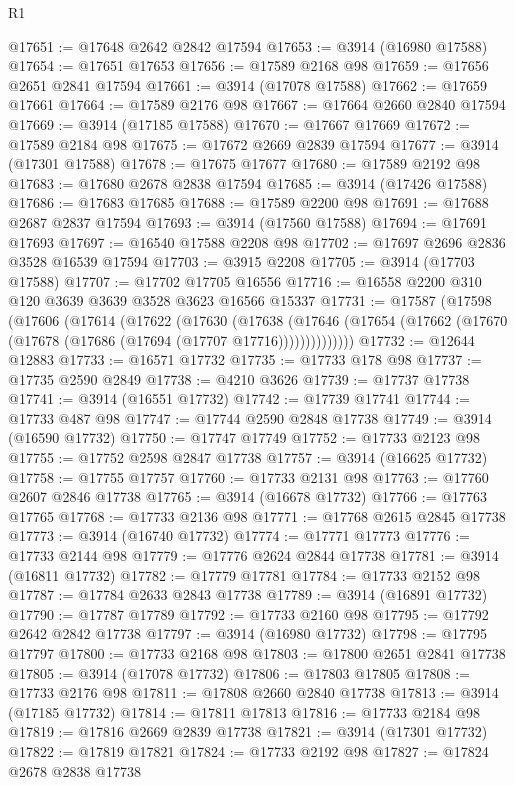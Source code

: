 \begin{lexlean}{R1}
\begin{coremodule}
@17651 := @17648 @2642 @2842 @17594
@17653 := @3914 (@16980 @17588)
@17654 := @17651 @17653
@17656 := @17589 @2168 @98
@17659 := @17656 @2651 @2841 @17594
@17661 := @3914 (@17078 @17588)
@17662 := @17659 @17661
@17664 := @17589 @2176 @98
@17667 := @17664 @2660 @2840 @17594
@17669 := @3914 (@17185 @17588)
@17670 := @17667 @17669
@17672 := @17589 @2184 @98
@17675 := @17672 @2669 @2839 @17594
@17677 := @3914 (@17301 @17588)
@17678 := @17675 @17677
@17680 := @17589 @2192 @98
@17683 := @17680 @2678 @2838 @17594
@17685 := @3914 (@17426 @17588)
@17686 := @17683 @17685
@17688 := @17589 @2200 @98
@17691 := @17688 @2687 @2837 @17594
@17693 := @3914 (@17560 @17588)
@17694 := @17691 @17693
@17697 := @16540 @17588 @2208 @98
@17702 := @17697 @2696 @2836 @3528 @16539 @17594
@17703 := @3915 @2208
@17705 := @3914 (@17703 @17588)
@17707 := @17702 @17705 @16556
@17716 := @16558 @2200 @310 @120 @3639 @3639 @3528 @3623 @16566 @15337
@17731 := @17587
    (@17598
      (@17606
        (@17614
          (@17622
            (@17630
              (@17638
                (@17646 (@17654 (@17662 (@17670 (@17678 (@17686 (@17694 (@17707 @17716))))))))))))))
@17732 := @12644 @12883
@17733 := @16571 @17732
@17735 := @17733 @178 @98
@17737 := @17735 @2590 @2849
@17738 := @4210 @3626
@17739 := @17737 @17738
@17741 := @3914 (@16551 @17732)
@17742 := @17739 @17741
@17744 := @17733 @487 @98
@17747 := @17744 @2590 @2848 @17738
@17749 := @3914 (@16590 @17732)
@17750 := @17747 @17749
@17752 := @17733 @2123 @98
@17755 := @17752 @2598 @2847 @17738
@17757 := @3914 (@16625 @17732)
@17758 := @17755 @17757
@17760 := @17733 @2131 @98
@17763 := @17760 @2607 @2846 @17738
@17765 := @3914 (@16678 @17732)
@17766 := @17763 @17765
@17768 := @17733 @2136 @98
@17771 := @17768 @2615 @2845 @17738
@17773 := @3914 (@16740 @17732)
@17774 := @17771 @17773
@17776 := @17733 @2144 @98
@17779 := @17776 @2624 @2844 @17738
@17781 := @3914 (@16811 @17732)
@17782 := @17779 @17781
@17784 := @17733 @2152 @98
@17787 := @17784 @2633 @2843 @17738
@17789 := @3914 (@16891 @17732)
@17790 := @17787 @17789
@17792 := @17733 @2160 @98
@17795 := @17792 @2642 @2842 @17738
@17797 := @3914 (@16980 @17732)
@17798 := @17795 @17797
@17800 := @17733 @2168 @98
@17803 := @17800 @2651 @2841 @17738
@17805 := @3914 (@17078 @17732)
@17806 := @17803 @17805
@17808 := @17733 @2176 @98
@17811 := @17808 @2660 @2840 @17738
@17813 := @3914 (@17185 @17732)
@17814 := @17811 @17813
@17816 := @17733 @2184 @98
@17819 := @17816 @2669 @2839 @17738
@17821 := @3914 (@17301 @17732)
@17822 := @17819 @17821
@17824 := @17733 @2192 @98
@17827 := @17824 @2678 @2838 @17738

\end{coremodule}
\end{lexlean}

